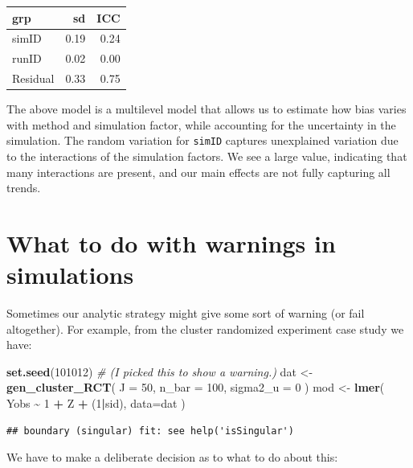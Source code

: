 \documentclass[
]{book}
\newenvironment{Shaded}{\begin{snugshade}}{\end{snugshade}}
\newcommand{\AttributeTok}[1]{\textcolor[rgb]{0.13,0.29,0.53}{#1}}
\newcommand{\CommentTok}[1]{\textcolor[rgb]{0.56,0.35,0.01}{\textit{#1}}}
\newcommand{\DecValTok}[1]{\textcolor[rgb]{0.00,0.00,0.81}{#1}}
\newcommand{\FunctionTok}[1]{\textcolor[rgb]{0.13,0.29,0.53}{\textbf{#1}}}
\newcommand{\NormalTok}[1]{#1}
\newcommand{\OtherTok}[1]{\textcolor[rgb]{0.56,0.35,0.01}{#1}}
\newcommand{\SpecialCharTok}[1]{\textcolor[rgb]{0.81,0.36,0.00}{\textbf{#1}}}
\begin{document}
\begin{tabular}{l|r|r}
\hline
grp & sd & ICC\\
\hline
simID & 0.19 & 0.24\\
\hline
runID & 0.02 & 0.00\\
\hline
Residual & 0.33 & 0.75\\
\hline
\end{tabular}

The above model is a multilevel model that allows us to estimate how bias varies with method and simulation factor, while accounting for the uncertainty in the simulation.
The random variation for \texttt{simID} captures unexplained variation due to the interactions of the simulation factors. We see a large value, indicating that many interactions are present, and our main effects are not fully capturing all trends.

\section{What to do with warnings in simulations}\label{what-to-do-with-warnings-in-simulations}

Sometimes our analytic strategy might give some sort of warning (or fail altogether).
For example, from the cluster randomized experiment case study we have:

\begin{Shaded}
\begin{Highlighting}[]
\FunctionTok{set.seed}\NormalTok{(}\DecValTok{101012}\NormalTok{)  }\CommentTok{\# (I picked this to show a warning.)}
\NormalTok{dat }\OtherTok{\textless{}{-}} \FunctionTok{gen\_cluster\_RCT}\NormalTok{( }\AttributeTok{J =} \DecValTok{50}\NormalTok{, }\AttributeTok{n\_bar =} \DecValTok{100}\NormalTok{, }\AttributeTok{sigma2\_u =} \DecValTok{0}\NormalTok{ )}
\NormalTok{mod }\OtherTok{\textless{}{-}} \FunctionTok{lmer}\NormalTok{( Yobs }\SpecialCharTok{\textasciitilde{}} \DecValTok{1} \SpecialCharTok{+}\NormalTok{ Z }\SpecialCharTok{+}\NormalTok{ (}\DecValTok{1}\SpecialCharTok{|}\NormalTok{sid), }\AttributeTok{data=}\NormalTok{dat )}
\end{Highlighting}
\end{Shaded}

\begin{verbatim}
## boundary (singular) fit: see help('isSingular')
\end{verbatim}

We have to make a deliberate decision as to what to do about this:
\end{document}
